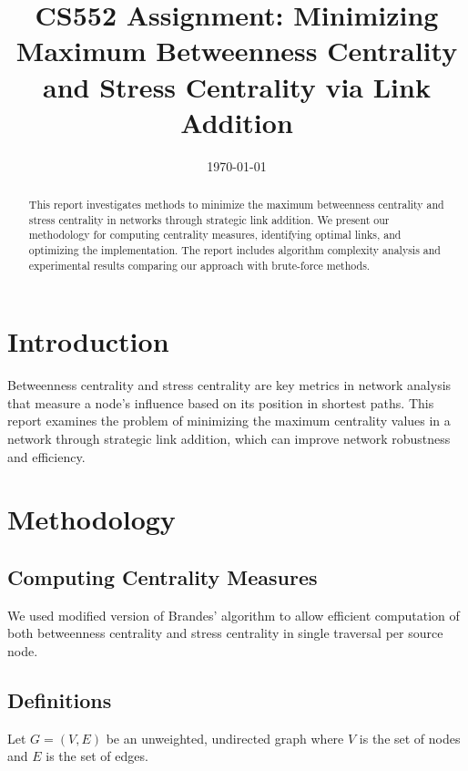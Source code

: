 \documentclass[12pt]{article}
\title{CS552 Assignment: Minimizing Maximum Betweenness Centrality and Stress Centrality via Link Addition}
\date{\today}
\begin{document}
\maketitle

\begin{abstract}
	This report investigates methods to minimize the maximum betweenness centrality and stress centrality in networks through strategic link addition. We present our methodology for computing centrality measures, identifying optimal links, and optimizing the implementation. The report includes algorithm complexity analysis and experimental results comparing our approach with brute-force methods.
\end{abstract}

\section{Introduction}
Betweenness centrality and stress centrality are key metrics in network analysis that measure a node's influence based on its position in shortest paths. This report examines the problem of minimizing the maximum centrality values in a network through strategic link addition, which can improve network robustness and efficiency.

\section{Methodology}

\subsection{Computing Centrality Measures}

We used modified version of Brandes' algorithm to allow efficient computation of both
betweenness centrality and stress centrality in single traversal per source
node.

\subsection*{Definitions}

Let \( G = (V, E) \) be an unweighted, undirected graph where \( V \) is the set
of nodes and \( E \) is the set of edges.
\end{document}
